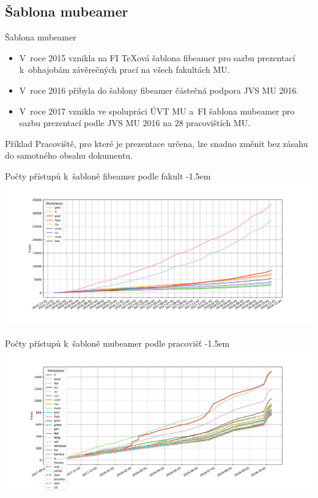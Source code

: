 \documentclass[
  aspectratio=169,
]{beamer}
\begin{document}
\subsection{Šablona mubeamer}

\begin{frame}{Šablona mubeamer}
\begin{itemize}
\item V~roce 2015 vznikla na FI \TeX ová \alert{šablona fibeamer pro sazbu prezentací k~obhajobám závěrečných prací na všech fakultách MU}.
\item V~roce 2016 přibyla do šablony fibeamer částečná podpora JVS MU 2016.
\item V~roce 2017 vznikla ve spolupráci ÚVT MU a~FI \alert{šablona mubeamer pro sazbu prezentací podle JVS MU 2016 na 28 pracovištích MU}.
\end{itemize}

\begin{block}{Příklad}
Pracoviště, pro které je prezentace určena, lze snadno změnit bez zásahu do samotného obsahu dokumentu.
\end{block}
\end{frame}

\begin{frame}{Počty přístupů k~šabloně fibeamer podle fakult}
\kern-1.5em\leavevmode{}\textwidth\relax
\includegraphics[width=1.1\textwidth]{figs/fibeamer}
\end{frame}

\begin{frame}{Počty přístupů k~šabloně mubeamer podle pracovišť}
\kern-1.5em\leavevmode\relax
\includegraphics[width=\textwidth]{figs/mubeamer}
\end{frame}
\end{document}
